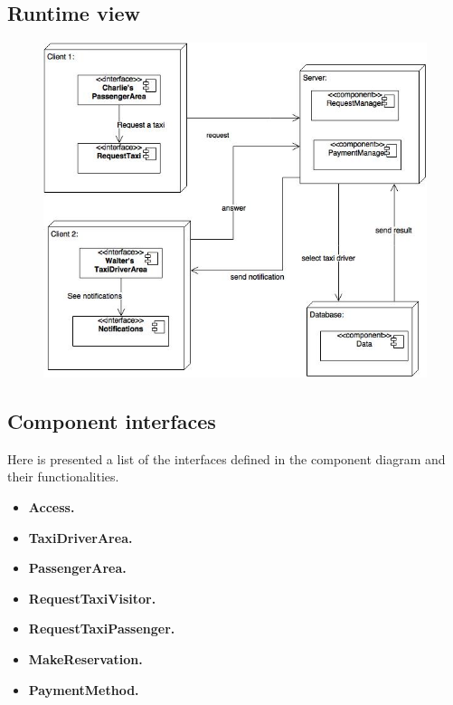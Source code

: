 		\subsection{Runtime view}
		\vspace{2cm}
			\begin{figure}[h]
				\centering
				\includegraphics[scale=0.65]{Diagrams/runTime.jpg}
			\end{figure}
	\newpage
		\subsection{Component interfaces}
		Here is presented a list of the interfaces defined in the component diagram and their functionalities.
		\begin{itemize}
			\item \textbf{Access.}
			\item \textbf{TaxiDriverArea.}
			\item \textbf{PassengerArea.}
			\item \textbf{RequestTaxiVisitor.}
			\item \textbf{RequestTaxiPassenger.}
			\item \textbf{MakeReservation.}
			\item \textbf{PaymentMethod.}
		\end{itemize}
	\newpage
